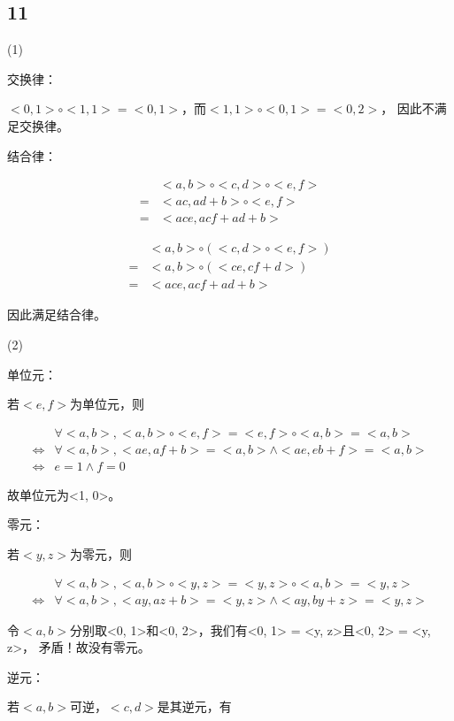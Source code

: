 \documentclass[UTF8]{ctexart}
\begin{document}
\subsection*{11}

(1)

交换律：

$<0, 1>\circ<1, 1> = <0, 1>$，而$<1, 1>\circ<0, 1> = <0, 2>$，
因此不满足交换律。

结合律：

\[
\begin{aligned}
    &<a, b>\circ<c, d>\circ<e, f>\\
    =& <ac, ad + b>\circ<e, f>\\
    =& <ace, acf + ad + b> 
\end{aligned}    
\]

\[
\begin{aligned}
    &<a, b>\circ(<c, d>\circ<e, f>)\\
    =& <a, b>\circ(<ce, cf + d>)\\
    =& <ace, acf + ad + b>
\end{aligned}
\]

因此满足结合律。

(2)

单位元：

若$<e, f>$为单位元，则

\[
\begin{aligned}
    &\forall <a, b>, <a, b> \circ <e, f> = <e, f> \circ <a, b> = <a, b>\\
    \Leftrightarrow &\forall <a, b>, <ae, af + b> = <a, b> \land <ae, eb + f> = <a, b>\\
    \Leftrightarrow &e = 1\land f = 0
\end{aligned}
\]

故单位元为<1, 0>。

零元：

若$<y, z>$为零元，则

\[
\begin{aligned}
    &\forall <a, b>, <a, b> \circ <y, z> = <y, z> \circ <a, b> = <y, z>\\
    \Leftrightarrow &\forall <a, b>, <ay, az + b> = <y, z> \land <ay, by + z> = <y, z>
\end{aligned}    
\]

令$<a, b>$分别取<0, 1>和<0, 2>，我们有<0, 1> = <y, z>且<0, 2> = <y, z>，
矛盾！故没有零元。

逆元：

若$<a, b>$可逆，$<c, d>$是其逆元，有
\end{document}
